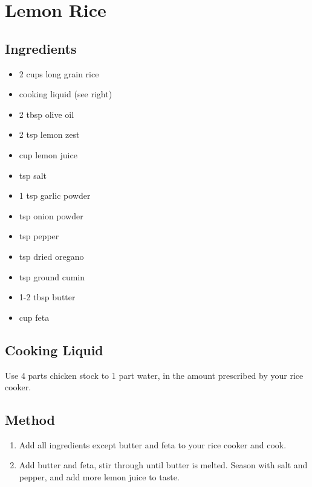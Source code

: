 \section{Lemon Rice}
\begin{multicols}{2}
  \subsection{Ingredients}
    \begin{itemize}
      \item 2 cups long grain rice
      \item cooking liquid (see right)
      \item 2 tbsp olive oil
      \item 2 tsp lemon zest
      \item {} cup lemon juice
      \item {} tsp salt
      \item 1 tsp garlic powder
      \item {} tsp onion powder
      \item {} tsp pepper
      \item {} tsp dried oregano
      \item {} tsp ground cumin
      \item 1-2 tbsp butter
      \item {} cup feta
    \end{itemize}
  \vfill\null
  \columnbreak
  \subsection{Cooking Liquid}
  Use 4 parts chicken stock to 1 part water, in the amount prescribed by your rice cooker.

  \subsection{Method}
    \begin{enumerate}
      \item Add all ingredients except butter and feta to your rice cooker and cook.
      \item Add butter and feta, stir through until butter is melted. Season with salt and pepper, and add more lemon juice to taste.
    \end{enumerate}
  \end{multicols}
